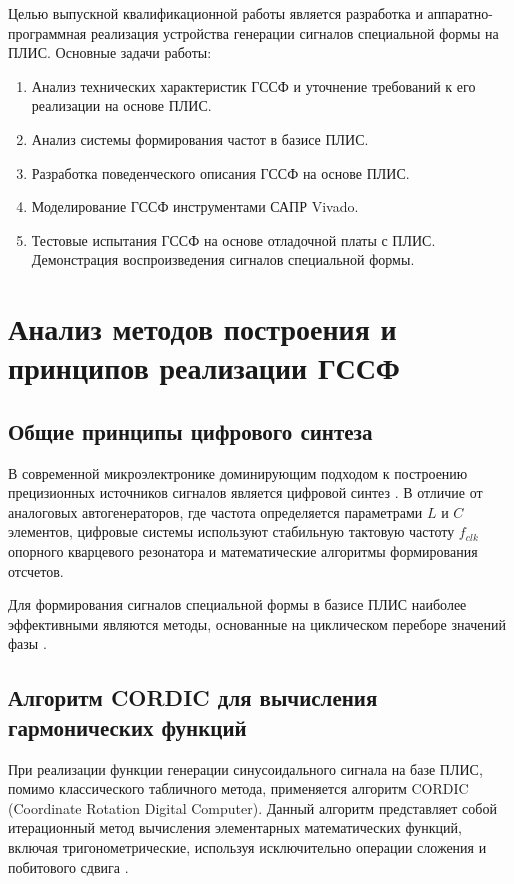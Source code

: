 \documentclass[12pt,a4paper,TimesNewRoman]{article}
\begin{document}
Целью выпускной квалификационной работы является разработка и аппаратно-программная реализация устройства генерации сигналов специальной формы на ПЛИС.
Основные задачи работы:
\begin{enumerate}
    \item Анализ технических характеристик ГССФ и уточнение требований к его реализации на основе ПЛИС.
    \item Анализ системы формирования частот в базисе ПЛИС.
    \item Разработка поведенческого описания ГССФ на основе ПЛИС.
    \item Моделирование ГССФ инструментами САПР Vivado.
    \item Тестовые испытания ГССФ на основе отладочной платы с ПЛИС. Демонстрация воспроизведения сигналов специальной формы.
\end{enumerate}

\section{Анализ методов построения и принципов реализации ГССФ}

\subsection{Общие принципы цифрового синтеза}
В современной микроэлектронике доминирующим подходом к построению прецизионных источников сигналов является цифровой синтез \cite{shunli}. В отличие от аналоговых автогенераторов, где частота определяется параметрами $L$ и $C$ элементов, цифровые системы используют стабильную тактовую частоту $f_{clk}$ опорного кварцевого резонатора и математические алгоритмы формирования отсчетов.

Для формирования сигналов специальной формы в базисе ПЛИС наиболее эффективными являются методы, основанные на циклическом переборе значений фазы \cite{tierney}.

\subsection{Алгоритм CORDIC для вычисления гармонических функций}
При реализации функции генерации синусоидального сигнала на базе ПЛИС, помимо классического табличного метода, применяется алгоритм CORDIC (Coordinate Rotation Digital Computer). Данный алгоритм представляет собой итерационный метод вычисления элементарных математических функций, включая тригонометрические, используя исключительно операции сложения и побитового сдвига \cite{cordic}.
\end{document}
